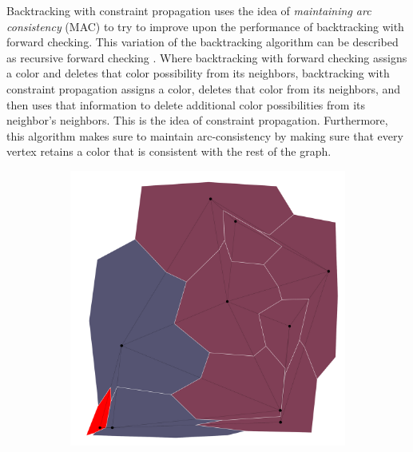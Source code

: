 \documentclass{article}
\begin{document}
		Backtracking with constraint propagation uses the idea of \textit{maintaining arc consistency} (MAC) to try to improve upon the performance of backtracking with forward checking. This variation of the backtracking algorithm can be described as recursive forward checking \cite{ai}. Where backtracking with forward checking assigns a color and deletes that color possibility from its neighbors, backtracking with constraint propagation assigns a color, deletes that color from its neighbors, and then uses that information to delete additional color possibilities from its neighbor's neighbors. This is the idea of constraint propagation. Furthermore, this algorithm makes sure to maintain arc-consistency by making sure that every vertex retains a color that is consistent with the rest of the graph.
	
		\begin{figure}[h!]
			\begin{subfigure}{0.18\textwidth}
				\centering
				\includegraphics[width=\textwidth]{images/sequences/mac_backtracking/bt_mac_I00003}
				\caption{}
			\end{subfigure}
			\;
			\begin{subfigure}{0.18\textwidth}
				\centering

\end{subfigure}
\end{figure}
\end{document}
